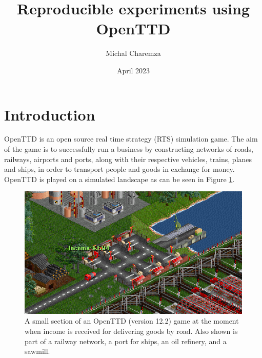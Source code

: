 \documentclass[twocolumn]{article}
\title{Reproducible experiments using OpenTTD}
\author{Michal Charemza}
\date{April 2023}
\begin{document}

\section{Introduction}

OpenTTD \cite{openttd} is an open source real time strategy (RTS) simulation game. The aim of the game is to successfully run a business by constructing networks of roads, railways, airports and ports, along with their respective vehicles, trains, planes and ships, in order to transport people and goods in exchange for money. OpenTTD is played on a simulated landscape as can be seen in Figure \ref{fig:openttd}.

\begin{figure}[h]
\centering
\includegraphics[width=\columnwidth]{assets/openttd-screenshot.png}
\caption{A small section of an OpenTTD (version 12.2) game at the moment when income is received for delivering goods by road. Also shown is part of a railway network, a port for ships, an oil refinery, and a sawmill.}
\label{fig:openttd}
\end{figure}
\end{document}
